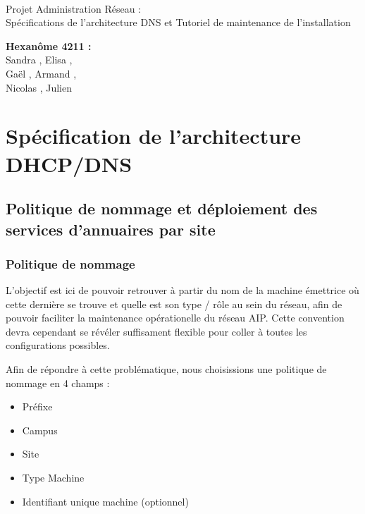 \documentclass[a4paper]{article}
\begin{document}
\begin{titlepage}
	~ 
	\vfill
	\begin{center}
		\begin{Huge}
			Projet Administration Réseau : \\ Spécifications de l'architecture DNS et Tutoriel de maintenance de l'installation\\
		\end{Huge}
	\vfill
		\textbf{Hexanôme 4211 :} 
			\\Sandra {}, Elisa , 
			\\Gaël , Armand , 
			\\Nicolas {}, Julien \\
	\vfill
	\end{center}
	\vfill
\end{titlepage}

\newpage
\tableofcontents
\newpage

\section{Spécification de l'architecture DHCP/DNS}

\subsection{Politique de nommage et déploiement des services d'annuaires par site}

\subsubsection{Politique de nommage}

L'objectif est ici de pouvoir retrouver à partir du nom de la machine émettrice où cette dernière se trouve et quelle est son type / rôle au sein du réseau, afin de pouvoir faciliter la maintenance opérationelle du réseau AIP. Cette convention devra cependant se révéler suffisament flexible pour coller à toutes les configurations possibles.

Afin de répondre à cette problématique, nous choisissions une politique de nommage en 4 champs : 

\begin{itemize}
\item Préfixe
\item Campus
\item Site
\item Type Machine
\item Identifiant unique machine (optionnel)
\end{itemize}
\end{document}

